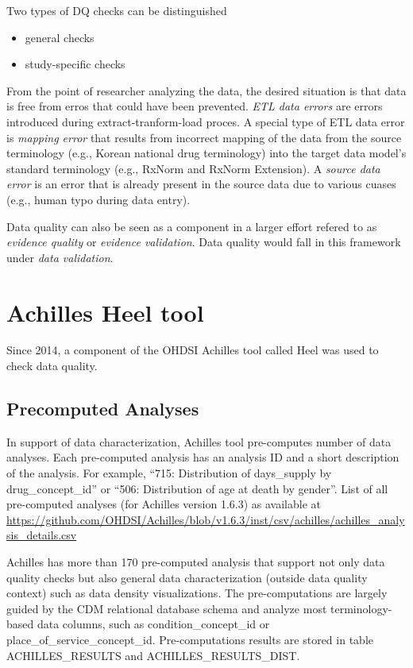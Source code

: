 \documentclass[]{book}
\providecommand{\tightlist}{%
  \setlength{\itemsep}{0pt}\setlength{\parskip}{0pt}}
\begin{document}
Two types of DQ checks can be distinguished\citep{weiskopf_methods_2013}

\begin{itemize}
\tightlist
\item
  general checks
\item
  study-specific checks
\end{itemize}

From the point of researcher analyzing the data, the desired situation
is that data is free from erros that could have been prevented.
\emph{ETL data errors} are errors introduced during
extract-tranform-load proces. A special type of ETL data error is
\emph{mapping error} that results from incorrect mapping of the data
from the source terminology (e.g., Korean national drug terminology)
into the target data model's standard terminology (e.g., RxNorm and
RxNorm Extension). A \emph{source data error} is an error that is
already present in the source data due to various cuases (e.g., human
typo during data entry).

Data quality can also be seen as a component in a larger effort refered
to as \emph{evidence quality} or \emph{evidence validation}. Data
quality would fall in this framework under \emph{data validation}.

\section{Achilles Heel tool}\label{achilles-heel-tool}

Since 2014, a component of the OHDSI Achilles tool called Heel was used
to check data quality.\citep{huser_methods_2018}

\subsection{Precomputed Analyses}\label{precomputed-analyses}

In support of data characterization, Achilles tool pre-computes number
of data analyses. Each pre-computed analysis has an analysis ID and a
short description of the analysis. For example, ``715: Distribution of
days\_supply by drug\_concept\_id'' or ``506: Distribution of age at
death by gender''. List of all pre-computed analyses (for Achilles
version 1.6.3) as available at
\url{https://github.com/OHDSI/Achilles/blob/v1.6.3/inst/csv/achilles/achilles_analysis_details.csv}

Achilles has more than 170 pre-computed analysis that support not only
data quality checks but also general data characterization (outside data
quality context) such as data density visualizations. The
pre-computations are largely guided by the CDM relational database
schema and analyze most terminology-based data columns, such as
condition\_concept\_id or place\_of\_service\_concept\_id.
Pre-computations results are stored in table ACHILLES\_RESULTS and
ACHILLES\_RESULTS\_DIST.
\end{document}

